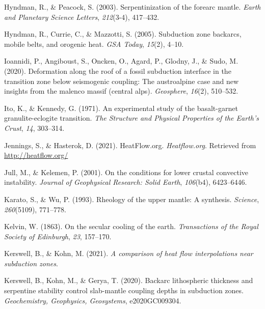 \begin{CSLReferences}{1}{1}
\leavevmode{}%
Hyndman, R., \& Peacock, S. (2003). Serpentinization of the forearc mantle. \emph{Earth and Planetary Science Letters}, \emph{212}(3-4), 417--432.

\leavevmode{}%
Hyndman, R., Currie, C., \& Mazzotti, S. (2005). Subduction zone backarcs, mobile belts, and orogenic heat. \emph{GSA Today}, \emph{15}(2), 4--10.

\leavevmode{}%
Ioannidi, P., Angiboust, S., Oncken, O., Agard, P., Glodny, J., \& Sudo, M. (2020). Deformation along the roof of a fossil subduction interface in the transition zone below seismogenic coupling: The austroalpine case and new insights from the malenco massif (central alps). \emph{Geosphere}, \emph{16}(2), 510--532.

\leavevmode{}%
Ito, K., \& Kennedy, G. (1971). An experimental study of the basalt-garnet granulite-eclogite transition. \emph{The Structure and Physical Properties of the Earth's Crust}, \emph{14}, 303--314.

\leavevmode{}%
Jennings, S., \& Hasterok, D. (2021). HeatFlow.org. \emph{Heatflow.org}. Retrieved from \url{http://heatflow.org/}

\leavevmode{}%
Jull, M., \& Kelemen, P. (2001). On the conditions for lower crustal convective instability. \emph{Journal of Geophysical Research: Solid Earth}, \emph{106}(b4), 6423--6446.

\leavevmode{}%
Karato, S., \& Wu, P. (1993). Rheology of the upper mantle: A synthesis. \emph{Science}, \emph{260}(5109), 771--778.

\leavevmode{}%
Kelvin, W. (1863). On the secular cooling of the earth. \emph{Transactions of the Royal Society of Edinburgh}, \emph{23}, 157--170.

\leavevmode{}%
Kerswell, B., \& Kohn, M. (2021). \emph{A comparison of heat flow interpolations near subduction zones}.

\leavevmode{}%
Kerswell, B., Kohn, M., \& Gerya, T. (2020). Backarc lithospheric thickness and serpentine stability control slab-mantle coupling depths in subduction zones. \emph{Geochemistry, Geophysics, Geosystems}, e2020GC009304.


\end{CSLReferences}
